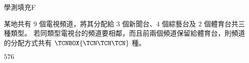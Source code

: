    \begin{QUESTION}
        \begin{ExamInfo}{95}{學測}{填充}{F}
        \end{ExamInfo}
        \begin{ExamAnsRateInfo}{44}{81}{44}{7}
        \end{ExamAnsRateInfo}
        \begin{QBODY}
            某地共有 9 個電視頻道，將其分配給 3 個新聞台、4 個綜藝台及 2 個體育台共三種類型。 若同類型電視台的頻道要相鄰，而且前兩個頻道保留給體育台，則頻道的分配方式共有 $\TCNBOX{\TCN\TCN\TCN}$ 種。
        \end{QBODY}
        \begin{QFROMS}
        \end{QFROMS}
        \begin{QTAGS}\end{QTAGS}
        \begin{QANS}
            $576$
        \end{QANS}
        \begin{QSOLLIST}
        \end{QSOLLIST}
        \begin{QEMPTYSPACE}
        \end{QEMPTYSPACE}
    \end{QUESTION}
